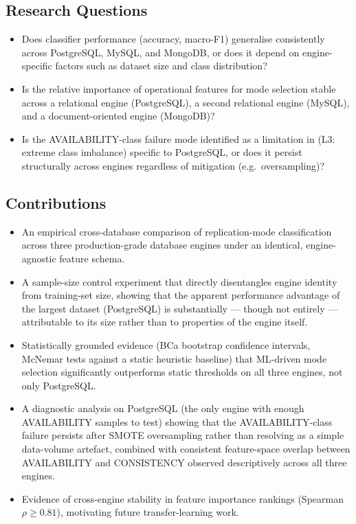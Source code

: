 \documentclass[pdflatex,sn-mathphys-num]{sn-jnl}
\theoremstyle{thmstyleone}
\theoremstyle{thmstylethree}
\begin{document}
\subsection{Research Questions}\label{subsec:rqs}

\begin{itemize}
\item[\textbf{RQ1}] Does classifier performance (accuracy, macro-F1)
  generalise consistently across PostgreSQL, MySQL, and MongoDB, or
  does it depend on engine-specific factors such as dataset size and
  class distribution?
\item[\textbf{RQ2}] Is the relative importance of operational features
  for mode selection stable across a relational engine (PostgreSQL),
  a second relational engine (MySQL), and a document-oriented engine
  (MongoDB)?
\item[\textbf{RQ3}] Is the AVAILABILITY-class failure mode identified
  as a limitation in \cite{iaha2026} (L3: extreme class imbalance)
  specific to PostgreSQL, or does it persist structurally across
  engines regardless of mitigation (e.g.\ oversampling)?
\end{itemize}

\subsection{Contributions}\label{subsec:contributions}

\begin{itemize}
\item An empirical cross-database comparison of replication-mode
  classification across three production-grade database engines under
  an identical, engine-agnostic feature schema.
\item A sample-size control experiment that directly disentangles
  engine identity from training-set size, showing that the apparent
  performance advantage of the largest dataset (PostgreSQL) is
  substantially --- though not entirely --- attributable to its size
  rather than to properties of the engine itself.
\item Statistically grounded evidence (BCa bootstrap confidence
  intervals, McNemar tests against a static heuristic baseline) that
  ML-driven mode selection significantly outperforms static thresholds
  on all three engines, not only PostgreSQL.
\item A diagnostic analysis on PostgreSQL (the only engine with enough
  AVAILABILITY samples to test) showing that the AVAILABILITY-class
  failure persists after SMOTE oversampling rather than resolving as a
  simple data-volume artefact, combined with consistent feature-space
  overlap between AVAILABILITY and CONSISTENCY observed descriptively
  across all three engines.
\item Evidence of cross-engine stability in feature importance rankings
  (Spearman $\rho \geq 0.81$), motivating future transfer-learning work.
\end{itemize}
\end{document}
